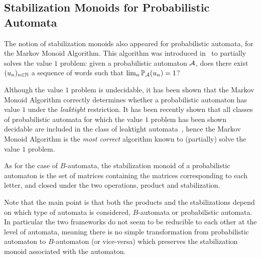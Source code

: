 \subsection{Stabilization Monoids for Probabilistic Automata}

The notion of stabilization monoids also appeared for probabilistic automata, for the Markov Monoid Algorithm.
This algorithm was introduced in~\cite{FGO12} to partially solves the value $1$ problem: given a probabilistic automaton $\mathcal{A}$,
does there exist $(u_n)_{n \in \mathbb{N}}$ a sequence of words such that $\lim_n \mathbb{P}_{\mathcal{A}}(u_n) = 1$?

Although the value $1$ problem is undecidable, it has been shown that
the Markov Monoid Algorithm correctly determines whether a probabilistic automaton has value $1$
under the \textit{leaktight} restriction.
It has been recently shown that all classes of probabilistic automata for which the value $1$ problem has been shown decidable 
are included in the class of leaktight automata~\cite{FGKO14},
hence the Markov Monoid Algorithm is the \textit{most correct} algorithm known to (partially) solve the value $1$ problem.

As for the case of $B$-automata, the stabilization monoid of a probabilistic automaton
is the set of matrices containing the matrices corresponding to each letter,
and closed under the two operations, product and stabilization.

Note that the main point is that both the products and the stabilizations depend on which type of automata is considered,
$B$-automata or probabilistic automata. In particular the two frameworks do not seem to be reducible to each other at the level of automata, meaning there is no simple transformation from probabilistic automaton to $B$-automaton (or vice-versa) which preserves the stabilization monoid associated with the automaton.